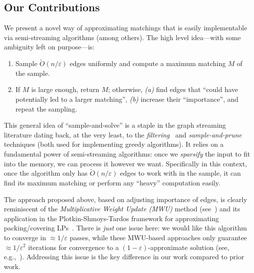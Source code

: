 \documentclass{article}
\newenvironment{Ourbox}{\begin{mdframed}[hidealllines=false,innerleftmargin=10pt,backgroundcolor=white!10,innertopmargin=10pt,innerbottommargin=10pt,roundcorner=10pt]}{\end{mdframed}}
\newcommand{\Ot}{\widetilde{O}}
\newcommand{\eps}{\varepsilon}
\begin{document}

\subsection*{Our Contributions}
We present a novel way of approximating matchings that is easily implementable via semi-streaming algorithms (among others). 
The high level idea---with some ambiguity left on purpose---is: 
\begin{Ourbox}
	\begin{enumerate}
		\item Sample $\Ot(n/\eps)$ edges uniformly and compute a maximum matching $M$ of the sample. 
		\item If $M$ is large enough, return $M$; otherwise, \emph{(a)} find edges that ``could have potentially led to a larger matching'',
		\emph{(b)} increase their ``importance'',  and repeat the sampling. 
	\end{enumerate}
\end{Ourbox}
This general idea of ``sample-and-solve'' is a staple in the graph streaming literature dating back, at the very least, to the \emph{filtering}~\cite{LattanziMSV11} and \emph{sample-and-prune}~\cite{KumarMVV13} techniques (both used for implementing greedy algorithms). It relies on a fundamental power of semi-streaming algorithms: once we \emph{sparsify} the input to fit into the memory, we can process it however we want. Specifically in this context, 
once the algorithm only has $\Ot(n/\eps)$ edges to work with in the sample, it can find its maximum matching or perform any ``heavy'' computation easily. 

The approach proposed above, based on adjusting importance of edges, is clearly reminiscent of the \emph{Multiplicative Weight Update (MWU)} method (see~\cite{AroraHK12}) and its application in the Plotkin-Shmoys-Tardos framework for approximating
packing/covering LPs~\cite{PlotkinST91}. There is \emph{just} one issue here: we would like this algorithm to converge in $\approx 1/\eps$ passes, while these MWU-based approaches
only guarantee $\approx 1/\eps^2$ iterations for convergence to a $(1-\eps)$-approximate solution (see, e.g.,~\cite{KleinY99}). Addressing this issue is the key difference in our work compared to prior work. 
\end{document}
